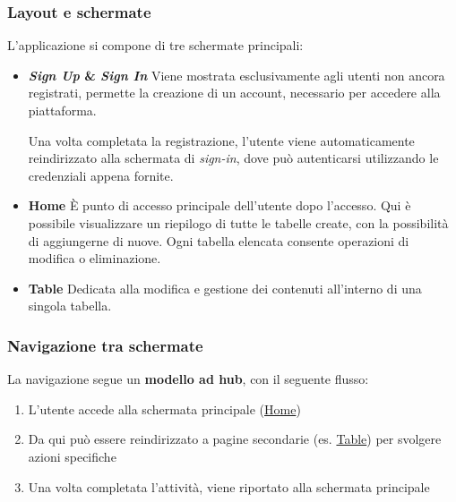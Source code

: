 \documentclass{beamer}
\begin{document}
\begin{frame}
  \frametitle{Layout e schermate}

  L’applicazione si compone di tre schermate principali:

  \begin{itemize}
    \item[\faUser] \textbf{\textit{Sign Up} \& \textit{Sign In}} \hspace{3pt} Viene mostrata esclusivamente agli utenti non ancora registrati, permette la creazione di un account, necessario per accedere alla piattaforma.

Una volta completata la registrazione, l’utente viene automaticamente reindirizzato alla schermata di \textit{sign-in}, dove può autenticarsi utilizzando le credenziali appena fornite.

    \item[\faHome] \label{ui_home} \textbf{Home} \hspace{3pt} È punto di accesso principale dell’utente dopo l'accesso. Qui è possibile visualizzare un riepilogo di tutte le tabelle create, con la possibilità di aggiungerne di nuove. Ogni tabella elencata consente operazioni di modifica o eliminazione.

    \item[\faTable] \label{ui_table} \textbf{Table} \hspace{3pt} Dedicata alla modifica e gestione dei contenuti all'interno di una singola tabella.

  \end{itemize}
\end{frame}

\begin{frame}
  \frametitle{Navigazione tra schermate}

  La navigazione segue un \textbf{modello ad hub}, con il seguente flusso:

  \begin{enumerate}
    \item L’utente accede alla schermata principale (\hyperref[ui_home]{Home})
    \item Da qui può essere reindirizzato a pagine secondarie (es. \hyperref[ui_table]{Table}) per svolgere azioni
specifiche
    \item Una volta completata l’attività, viene riportato alla schermata principale
  \end{enumerate}

\end{frame}
\end{document}
